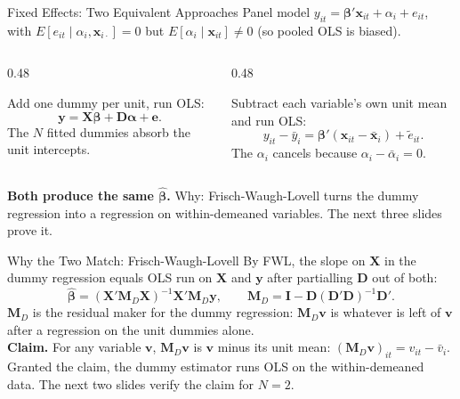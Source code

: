 \documentclass[aspectratio=169, handout]{beamer}
\numberwithin{equation}{section}
\begin{document}
\begin{frame}{Fixed Effects: Two Equivalent Approaches}
Panel model $y_{it}=\bm{\beta}'\bm{x}_{it}+\alpha_i+e_{it}$, with $E[e_{it}\mid\alpha_i,\bm{x}_{i\cdot}]=0$ but $E[\alpha_i\mid\bm{x}_{it}]\neq 0$ (so pooled OLS is biased).\\[6pt]

\begin{columns}[T]
\begin{column}{0.48\textwidth}
\begin{tcolorbox}[colback=blue!8, colframe=blue, title=Dummy variables]
Add one dummy per unit, run OLS:
$$\bm{y}=\bm{X}\bm{\beta}+\bm{D}\bm{\alpha}+\bm{e}.$$
The $N$ fitted dummies absorb the unit intercepts.
\end{tcolorbox}
\end{column}
\begin{column}{0.48\textwidth}
\begin{tcolorbox}[colback=darkgreen!8, colframe=darkgreen, title={Demean within units, then regress}]
Subtract each variable's own unit mean and run OLS:
$$y_{it}-\bar{y}_i=\bm{\beta}'(\bm{x}_{it}-\bar{\bm{x}}_i)+\tilde e_{it}.$$
The $\alpha_i$ cancels because $\alpha_i-\bar\alpha_i=0$.
\end{tcolorbox}
\end{column}
\end{columns}
\vspace{4pt}

\textbf{Both produce the same $\hat{\bm{\beta}}$.} Why: Frisch-Waugh-Lovell turns the dummy regression into a regression on within-demeaned variables. The next three slides prove it.
\end{frame}

\begin{frame}{Why the Two Match: Frisch-Waugh-Lovell}
By FWL, the slope on $\bm{X}$ in the dummy regression equals OLS run on $\bm{X}$ and $\bm{y}$ after partialling $\bm{D}$ out of both:
$$\hat{\bm{\beta}}=(\bm{X}'\bm{M}_D\bm{X})^{-1}\bm{X}'\bm{M}_D\bm{y}, \qquad \bm{M}_D=\bm{I}-\bm{D}(\bm{D}'\bm{D})^{-1}\bm{D}'.$$
$\bm{M}_D$ is the residual maker for the dummy regression: $\bm{M}_D\bm{v}$ is whatever is left of $\bm{v}$ after a regression on the unit dummies alone.\\[6pt]

\textbf{Claim.} For any variable $\bm{v}$, $\bm{M}_D\bm{v}$ is $\bm{v}$ minus its unit mean: $(\bm{M}_D\bm{v})_{it}=v_{it}-\bar{v}_i$. Granted the claim, the dummy estimator runs OLS on the within-demeaned data. The next two slides verify the claim for $N=2$.
\end{frame}
\end{document}
